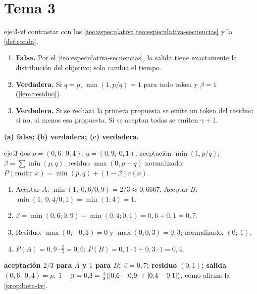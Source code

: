 \section{Tema 3}

\begin{solucion}{eje:3-vf}
\planteamiento contrastar con los \cref{teo:especulativa,teo:especulativa-secuencias} y la \cref{def:ronda}.
\pasos
\begin{enumerate}[label=(\alph*)]
  \item \textbf{Falsa.} Por el \cref{teo:especulativa-secuencias}, la salida tiene exactamente la distribución del objetivo; solo cambia el tiempo.
  \item \textbf{Verdadera.} Si $q=p$, $\min(1,p/q)=1$ para todo token y $\beta=1$ (\cref{lem:residuo}).
  \item \textbf{Verdadera.} Si se rechaza la primera propuesta se emite un token del residuo; si no, al menos esa propuesta. Si se aceptan todas se emiten $\gamma+1$.
\end{enumerate}
\resultado \textbf{(a) falsa; (b) verdadera; (c) verdadera.}
\end{solucion}

\begin{solucion}{eje:3-dos}
\datos $p=(0{,}6;\allowbreak\ 0{,}4)$, $q=(0{,}9;\allowbreak\ 0{,}1)$.
\planteamiento aceptación $\min(1,p/q)$; $\beta=\sum\min(p,q)$; residuo $\max(0,p-q)$ normalizado; $P(\text{emitir }x)=\min(p,q)+(1-\beta)r(x)$.
\pasos
\begin{enumerate}[label=\arabic*.]
  \item Aceptar $A$: $\min(1;\allowbreak\ 0{,}6/0{,}9)=2/3\approx 0{,}6667$. Aceptar $B$: $\min(1;\allowbreak\ 0{,}4/0{,}1)=\min(1;4)=1$.
  \item $\beta=\min(0{,}6;0{,}9)+\min(0{,}4;0{,}1)=0{,}6+0{,}1=0{,}7$.
  \item Residuo: $\max(0;-0{,}3)=0$ y $\max(0;0{,}3)=0{,}3$; normalizado, $(0;\allowbreak\ 1)$.
  \item $P(A)=0{,}9\cdot\frac23=0{,}6$; $P(B)=0{,}1\cdot 1+0{,}3\cdot 1=0{,}4$.
\end{enumerate}
\resultado \textbf{aceptación $2/3$ para $A$ y $1$ para $B$; $\beta=0{,}7$; residuo $(0,1)$; salida $(0{,}6;\allowbreak\ 0{,}4)=p$.}
\comprobacion $1-\beta=0{,}3=\frac12(\lvert0{,}6-0{,}9\rvert+\lvert0{,}4-0{,}1\rvert)$, como afirma la \cref{prop:beta-tv}.
\end{solucion}


